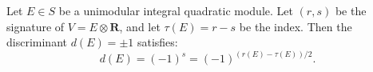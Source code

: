 Let $E \in S$ be a unimodular integral quadratic module. Let $(r,s)$ be the signature of $V = E \otimes \mathbf{R}$, and let $\tau(E) = r - s$ be the index. Then the discriminant $d(E) = \pm 1$ satisfies:
$$
d(E) = (-1)^s = (-1)^{(r(E) - \tau(E))/2}.
$$

